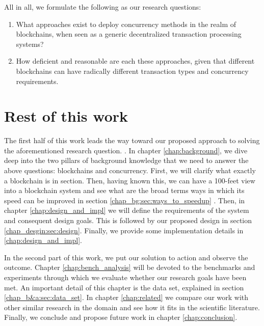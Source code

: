  All in all, we formulate the following as our research questions:

 \begin{enumerate}
     \item What approaches exist to deploy concurrency methods in the realm of blockchains, when
     seen as a generic decentralized transaction processing systems?
     \item How deficient and reasonable are each these approaches, given that different blockchains
     can have radically different transaction types and concurrency requirements.
 \end{enumerate}

\section{Rest of this work}

The first half of this work leads the way toward our proposed approach to solving the aforementioned
research question. . In
chapter \ref{chap:background}, we dive deep into the two pillars of background knowledge that we
need to answer the above questions: blockchains and concurrency. First, we will clarify what exactly
a blockchain is in section. Then, having known this, we can have a 100-feet view into a blockchain
system and see what are the broad terms ways in which its speed can be improved in section
\ref{chap_bg:sec:ways_to_speedup} . Then, in chapter \ref{chap:design_and_impl} we will define the
requirements of the system and consequent design goals. This is followed by our proposed design in
section \ref{chap_desgin:sec:design}. Finally, we provide some implementation details in
\ref{chap:design_and_impl}.

In the second part of this work, we put our solution to action and observe the outcome. Chapter
\ref{chap:bench_analysis} will be devoted to the benchmarks and experiments through which we
evaluate whether our research goals have been met. An important detail of this chapter is the data
set, explained in section \ref{chap_b&a:sec:data_set}. In chapter \ref{chap:related} we compare our
work with other similar research in the domain and see how it fits in the scientific literature.
Finally, we conclude and propose future work in chapter \ref{chap:conclusion}.

